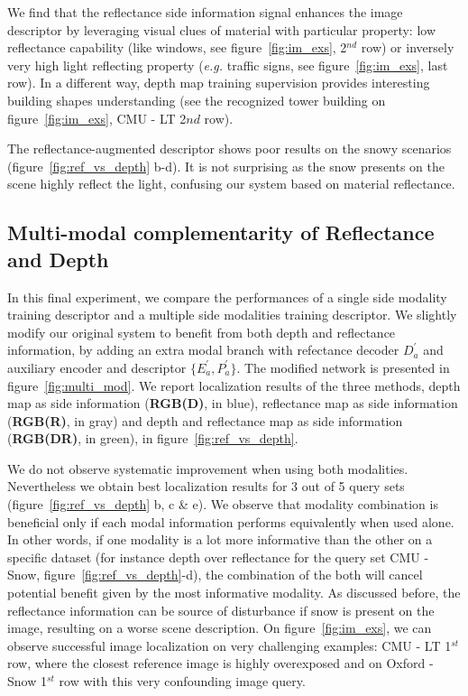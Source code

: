 We find that the reflectance side information signal enhances the image descriptor by leveraging visual clues of material with particular property: low reflectance capability (like windows, see figure~\ref{fig:im_exs}, 2$^{nd}$ row) or inversely very high light reflecting property (\textit{e.g.} traffic signs, see figure~\ref{fig:im_exs}, last row). In a different way, depth map training supervision provides interesting building shapes understanding (see the recognized tower building on figure~\ref{fig:im_exs}, CMU - LT 2$nd$ row).

The reflectance-augmented descriptor shows poor results on the snowy scenarios (figure~\ref{fig:ref_vs_depth} b-d). It is not surprising as the snow presents on the scene highly reflect the light, confusing our system based on material reflectance. 

\subsection{Multi-modal complementarity of Reflectance and Depth}

In this final experiment, we compare the performances of a single side modality training descriptor and a multiple side modalities training descriptor. We slightly modify our original system to benefit from both depth and reflectance information, by adding an extra modal branch with refectance decoder $D_a^{\prime}$ and auxiliary encoder and descriptor $\{E_a^{\prime}, P_a^{\prime}\}$. The modified network is presented in figure~\ref{fig:multi_mod}. We report localization results of the three methods, depth map as side information (\textbf{RGB(D)}, in blue), reflectance map as side information (\textbf{RGB(R)}, in gray) and depth and reflectance map as side information (\textbf{RGB(DR)}, in green), in figure~\ref{fig:ref_vs_depth}.

We do not observe systematic improvement when using both modalities. Nevertheless we obtain best localization results for 3 out of 5 query sets (figure~\ref{fig:ref_vs_depth} b, c \& e). We observe that modality combination is beneficial only if each modal information performs equivalently when used alone. In other words, if one modality is a lot more informative than the other on a specific dataset (for instance depth over reflectance for the query set CMU - Snow, figure~\ref{fig:ref_vs_depth}-d), the combination of the both will cancel potential benefit given by the most informative modality.  As discussed before, the reflectance information can be source of disturbance if snow is present on the image, resulting on a worse scene description. On figure~\ref{fig:im_exs}, we can observe successful image localization on very challenging examples: CMU - LT 1$^{st}$ row, where the closest reference image is highly overexposed and on Oxford - Snow 1$^{st}$ row with this very confounding image query.

